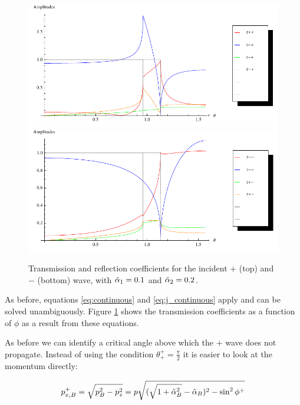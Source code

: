 \begin{figure}
    \begin{center}
        \includegraphics[width=\textwidth]{nonzero-plus.pdf}
        \includegraphics[width=\textwidth]{nonzero-minus.pdf}
    \end{center}
    \caption{Transmission and reflection coefficients for the
        incident $+$ (top) and $-$ (bottom) wave, with
        $\tilde \alpha_1 = 0.1$ and $\tilde \alpha_2 = 0.2$.}
    \label{fig:plots-nonzero}
\end{figure}

As before, equations \ref{eq:continuous} and \ref{eq:j_continuous}
apply and can be solved unambiguously. Figure \ref{fig:plots-nonzero}
shows the transmission coefficients as a function of $\phi$ as a
result from these equations.

As before we can identify a critical angle above which the $+$ wave
does not propagate. Instead of using the condition $\theta^+_+ =
\frac{\pi}{2}$ it is easier to look at the momentum directly:

\begin{align}
    p_{x,B}^+ = \sqrt{ p_B^2 - p_z^2} = p \sqrt{(\sqrt{1+\tilde \alpha_B^2} -
            \tilde \alpha_B)^2 - \sin^2 \phi^+}
\end{align}

